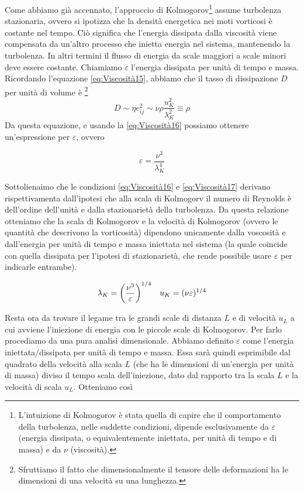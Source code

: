 Come abbiamo già accennato, l'approccio di Kolmogorov\footnote{L'intuizione di Kolmogorov è stata quella di capire che il comportamento della turbolenza, nelle suddette condizioni, dipende esclusivamente da $\varepsilon$ (energia dissipata, o equivalentemente iniettata, per unità di tempo e di massa) e da $\nu$ (viscosità).} assume turbolenza stazionaria, ovvero si ipotizza che la densità energetica nei moti vorticosi è costante nel tempo. Ciò significa che l'energia dissipata dalla viscosità viene compensata da un'altro processo che inietta energia nel sistema, mantenendo la turbolenza. In altri termini il flusso di energia da scale maggiori a scale minori deve essere costante. Chiamiamo $\varepsilon$ l'energia dissipata per unità di tempo e massa.
Ricordando l'equazione \ref{eq:Viscosità15}, abbiamo che il tasso di dissipazione $D$ per unità di volume è \footnote{Sfruttiamo il fatto che dimensionalmente il tensore delle deformazioni ha le dimensioni di una velocità su una lunghezza.}
\begin{equation}
D \sim \eta e_{ij}^2 \sim \nu\rho \dfrac{u_K^2}{\lambda_K^2} \equiv \rho \label{eq:Viscosità17}
\end{equation}
Da questa equazione, e usando la \ref{eq:Viscosità16} possiamo ottenere un'espressione per $\varepsilon$, ovvero
\begin{EQ}
\begin{equation}
\varepsilon = \dfrac{\nu^3}{\lambda_K^4} \label{eq:Viscosità18}
\end{equation}
\end{EQ}
Sottolienaimo che le condizioni \ref{eq:Viscosità16} e \ref{eq:Viscosità17} derivano rispettivamenta dall'ipotesi che alla scala di Kolmogorv il numero di Reynolds è dell'ordine dell'unità e dalla stazionarietà della turbolenza.
Da questa relazione otteniamo che la scala di Kolmogorov e la velocità di Kolmogorov (ovvero le quantità che descrivono la vorticosità) dipendono unicamente dalla voscosità e dall'energia per unità di tempo e massa iniettata nel sistema (la quale coincide con quella dissipata per l'ipotesi di stazionarietà, che rende possibile usare $\varepsilon$ per indicarle entrambe).
\begin{EQ}
\begin{align}
&\lambda_K = \left( \dfrac{\nu^3}{\varepsilon} \right)^{1/4}
&u_K = (\nu \varepsilon)^{1/4}
\end{align}
\end{EQ}
Resta ora da trovare il legame tra le grandi scale di distanza $L$ e di velocità $u_L$ a cui avviene l'iniezione di energia con le piccole scale di Kolmogorov. Per farlo procediamo da una pura analisi dimensionale. Abbiamo definito $\varepsilon$ come l'energia iniettata/dissipata per unità di tempo e massa. Essa sarà quindi esprimibile dal quadrato della velocità alla scala $L$ (che ha le dimensioni di un'energia per unità di massa) diviso il tempo scala dell'iniezione, dato dal rapporto tra la scala $L$ e la velocità di scala $u_L$. Otteniamo così
